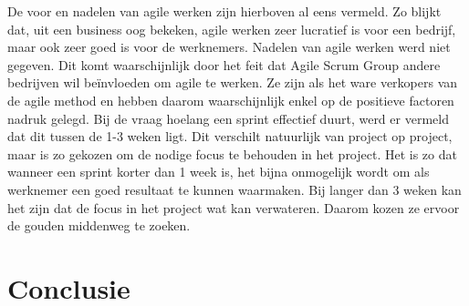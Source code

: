 \documentclass{hogent-article}
\begin{document}
De voor en nadelen van agile werken zijn hierboven al eens vermeld. Zo blijkt dat, uit een business oog bekeken, agile werken zeer lucratief is voor een bedrijf, maar ook zeer goed is voor de werknemers. Nadelen van agile werken werd niet gegeven. Dit komt waarschijnlijk door het feit dat Agile Scrum Group andere bedrijven wil beïnvloeden om agile te werken. Ze zijn als het ware verkopers van de agile method en hebben daarom waarschijnlijk enkel op de positieve factoren nadruk gelegd.\newline
Bij de vraag hoelang een sprint effectief duurt, werd er vermeld dat dit tussen de 1-3 weken ligt. Dit verschilt natuurlijk van project op project, maar is zo gekozen om de nodige focus te behouden in het project. Het is zo dat wanneer een sprint korter dan 1 week is, het bijna onmogelijk wordt om als werknemer een goed resultaat te kunnen waarmaken. Bij langer dan 3 weken kan het zijn dat de focus in het project wat kan verwateren. Daarom kozen ze ervoor de gouden middenweg te zoeken.
\section{Conclusie}




\printbibliography
\end{document}
